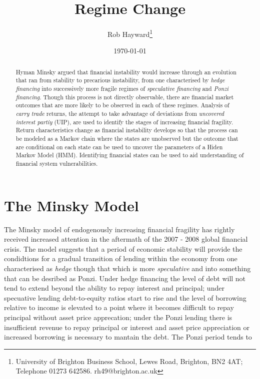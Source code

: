 \documentclass[12pt, a4paper, oneside]{article} %
\begin{document}
\title{Regime Change}
\author{Rob Hayward\footnote{University of Brighton Business School, Lewes Road, Brighton, BN2 4AT; Telephone 01273 642586.  rh49@brighton.ac.uk}} 
\date{\today}
\maketitle
\begin{abstract}
Hyman Minsky argued that financial instability would increase through an evolution that ran from stability to precarious instability, from one characterised by \emph{hedge financing} into successively more fragile regimes of \emph{speculative financing} and \emph{Ponzi financing}.  Though this process is not directly observable, there are financial market outcomes that are more likely to be observed in each of these regimes.  Analysis of \emph{carry trade} returns, the attempt to take advantage of deviations from \emph{uncovered interest partiy} (UIP), are used to identify the stages of increasing financial fragility.  Return characteristics change as financial instability develops so that the process can be modeled as a Markov chain where the states are unobserved but the outcome that are conditional on each state can be used to uncover the parameters of a Hiden Markov Model (HMM).   Identifying financial states can be used to aid understanding of financial system vulnerabilities. 

\end{abstract}

\section{The Minsky Model}
The Minsky model of endogenously increasing financial fragility has rightly received increased attention in the aftermath of the 2007 - 2008 global financial crisis.  The model suggests that a period of economic stability will provide the condidtions for a gradual transition of lending within the economy from one characterised as \emph{hedge} though that which is more \emph{speculative} and into something that can be desribed as {Ponzi}.  Under hedge financing the level of debt will not tend to extend beyond the ability to repay interest and principal; under specuative lending debt-to-equity ratios start to rise and the level of borrowing relative to income is elevated to a point where it becomes difficult to repay principal without asset price apprecation; under the Ponzi lending there is insufficient revenue to repay principal or interest and asset price appreciation or increased borrowing is necessary to mantain the debt. The Ponzi period tends to 
\end{document}
